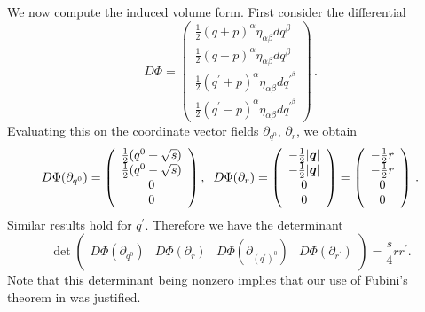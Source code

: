  We now compute the induced volume form. First consider the differential 
\begin{equation}
 D\Phi=\left( \begin{array}{c}
\frac{1}{2}(q+p)^\alpha\eta_{\alpha\beta}dq^\beta \\
\frac{1}{2}(q-p)^\alpha\eta_{\alpha\beta}dq^\beta\\
\frac{1}{2}(q^{\prime}+p)^\alpha\eta_{\alpha\beta}dq^{'^\beta}  \\
\frac{1}{2}(q^{\prime}-p)^\alpha\eta_{\alpha\beta}dq^{'^\beta}  \end{array} \right)\,.
\end{equation}
Evaluating this on the coordinate vector fields $\partial_{q^0}$, $\partial_r$, we obtain
\begin{equation}
 D\Phi(\partial_{q^0})=\left( \begin{array}{c}
\frac{1}{2}(q^0+\sqrt{s}) \\
\frac{1}{2}(q^0-\sqrt{s}) \\
0\\
0 \end{array} \right), \hspace{2mm}  D\Phi(\partial_{r})=\left( \begin{array}{c}
-\frac{1}{2}|\vec{q}| \\
-\frac{1}{2}|\vec{q}| \\
0\\
0 \end{array} \right)=\left( \begin{array}{c}
-\frac{1}{2}r \\
-\frac{1}{2}r \\
0\\
0 \end{array} \right)\,.
\end{equation}
Similar results hold for $q^{\prime}$.  Therefore we have the determinant
\begin{equation}
\det\left( \begin{array}{cccc}
D\Phi(\partial_{q^0}) & D\Phi(\partial_{r}) & D\Phi(\partial_{(q^{\prime})^0}) & D\Phi(\partial_{r^{\prime}}) \end{array} \right)=\frac{s}{4}rr^{\prime}.
\end{equation}
Note that this determinant being nonzero implies that our use of Fubini's theorem in  was justified.

